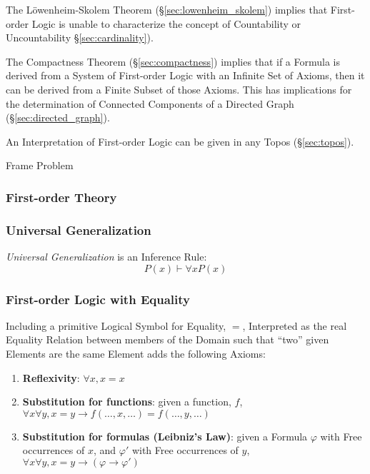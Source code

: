 The L\"owenheim-Skolem Theorem (\S\ref{sec:lowenheim_skolem}) implies
that First-order Logic is unable to characterize the concept of
Countability or Uncountability \S\ref{sec:cardinality}).

The Compactness Theorem (\S\ref{sec:compactness}) implies that
if a Formula is derived from a System of First-order Logic with an
Infinite Set of Axioms, then it can be derived from a Finite Subset of
those Axioms. This has implications for the determination of Connected
Components of a Directed Graph (\S\ref{sec:directed_graph}).

An Interpretation of First-order Logic can be given in any Topos
(\S\ref{sec:topos}).

Frame Problem %



\subsubsection{First-order Theory}\label{sec:firstorder_theory}

\subsubsection{Universal Generalization}\label{sec:universal_generalization}

\emph{Universal Generalization} is an Inference Rule:
\[
  P(x) \vdash \forall x P(x)
\]



\subsubsection{First-order Logic with Equality}
\label{sec:firstorder_equality}

Including a primitive Logical Symbol for Equality, $=$, Interpreted as
the real Equality Relation between members of the Domain such that
``two'' given Elements are the same Element adds the following Axioms:

\begin{enumerate}
\item \textbf{Reflexivity}: $\forall x, x=x$
\item \textbf{Substitution for functions}: given a function, $f$,
  $\forall x \forall y, x = y \rightarrow f(\ldots,x,\ldots) =
  f(\ldots,y,\ldots)$
\item \textbf{Substitution for formulas (Leibniz's Law)}: given a
  Formula $\varphi$ with Free occurrences of $x$, and $\varphi '$ with
  Free occurrences of $y$, $\forall x \forall y, x = y \rightarrow
  (\varphi \rightarrow \varphi ')$
\end{enumerate}


